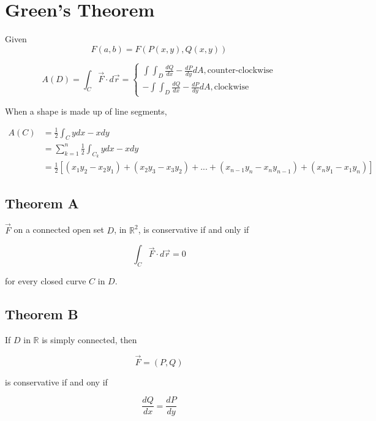 \section{Green's Theorem}

  Given
  \begin{displaymath}
    F\left( a, b \right) = F\left( P\left( x, y \right), Q\left( x, y \right) \right)
  \end{displaymath}

  \begin{equation}
    A\left( D \right) = \int_{C} \vec{F} \cdot d\vec{r} =
    \begin{cases}
      \int \int_{D} \frac{dQ}{dx} - \frac{dP}{dy} dA, \text{counter-clockwise} \\
      - \int \int_{D} \frac{dQ}{dx} - \frac{dP}{dy} dA, \text{clockwise}
    \end{cases}
  \end{equation}

  When a shape is made up of line segments,

  \begin{align}
    A\left( C \right) &= \frac{1}{2} \int_{C} y dx - x dy \\
    &= \sum_{k = 1}^{n} \frac{1}{2} \int_{C_{k}} y dx - x dy \\
    &= \frac{1}{2}
    \left[
      \left( x_{1} y_{2} - x_{2} y_{1} \right) +
      \left( x_{2} y_{3} - x_{3} y_{2} \right) +
      ... +
      \left( x_{n - 1} y_{n} - x_{n} y_{n - 1} \right) +
      \left( x_{n} y_{1} - x_{1} y_{n} \right)
    \right]
  \end{align}

  \subsection{Theorem A}

    $ \vec{F} $ on a connected open set $ D $, in $ \mathbb{R}^{2} $,
    is conservative if and only if

    \begin{equation}
      \int_{C} \vec{F} \cdot d\vec{r} = 0
    \end{equation}

    for every closed curve $ C $ in $ D $.

  \subsection{Theorem B}

    If $ D $ in $ \mathbb{R} $ is simply connected, then

    \begin{equation}
      \vec{F} = \left( P, Q \right)
    \end{equation}

    is conservative if and ony if

    \begin{equation}
      \frac{dQ}{dx} = \frac{dP}{dy}
    \end{equation}